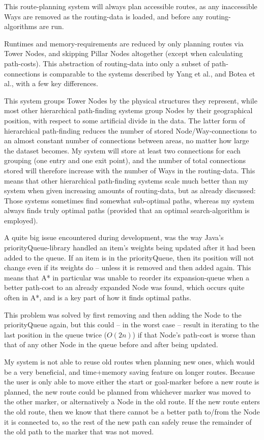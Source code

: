 This route-planning system will always plan accessible routes, as any inaccessible Ways are removed as the routing-data is loaded, and before any routing-algorithms are run.

Runtimes and memory-requirements are reduced by only planning routes via Tower Nodes, and skipping Pillar Nodes altogether (except when calculating path-costs). This abstraction of routing-data into only a subset of path-connections is comparable to the systems described by Yang et al.\cite{CCAI07}, and Botea et al.\cite{botea-etal-jogd04}, with a few key differences.

This system groups Tower Nodes by the physical structures they represent, while most other hierarchical path-finding systems group Nodes by their geographical position, with respect to some artificial divide in the data. The latter form of hierarchical path-finding reduces the number of stored Node/Way-connections to an almost constant number of connections between areas, no matter how large the dataset becomes. My system will store at least two connections for each grouping (one entry and one exit point), and the number of total connections stored will therefore increase with the number of Ways in the routing-data. This means that other hierarchical path-finding systems scale much better than my system when given increasing amounts of routing-data, but as already discussed: Those systems sometimes find somewhat sub-optimal paths, whereas my system always finds truly optimal paths (provided that an optimal search-algorithm is employed).

A quite big issue encountered during development, was the way Java's priorityQueue-library handled an item's weights being updated after it had been added to the queue. If an item is in the priorityQueue, then its position will not change even if its weights do -- unless it is removed and then added again. This means that A* in particular was unable to reorder its expansion-queue when a better path-cost to an already expanded Node was found, which occurs quite often in A*, and is a key part of how it finds optimal paths.

This problem was solved by first removing and then adding the Node to the priorityQueue again, but this could -- in the worst case -- result in iterating to the last position in the queue twice ($O(2n)$) if that Node's path-cost is worse than that of any other Node in the queue before and after being updated.

My system is not able to reuse old routes when planning new ones, which would be a very beneficial, and time+memory saving feature on longer routes. Because the user is only able to move either the start or goal-marker before a new route is planned, the new route could be planned from whichever marker was moved to the other marker, or alternatively a Node in the old route. If the new route enters the old route, then we know that there cannot be a better path to/from the Node it is connected to, so the rest of the new path can safely reuse the remainder of the old path to the marker that was not moved.

